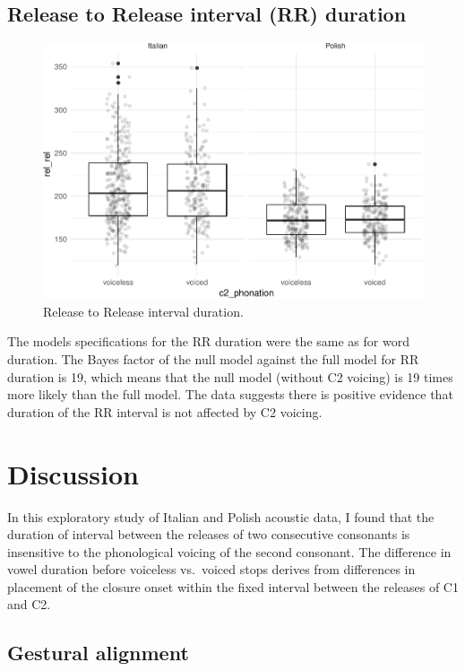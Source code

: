 \documentclass[preprint]{JASAnew}
\begin{document}
\hypertarget{release-to-release-interval-rr-duration}{%
\subsection{Release to Release interval (RR)
duration}\label{release-to-release-interval-rr-duration}}

\begin{figure}
\centering
\includegraphics{2018-jasa_files/figure-latex/rr-plot-1.pdf}
\caption{Release to Release interval duration.}
\end{figure}

The models specifications for the RR duration were the same as for word
duration. The Bayes factor of the null model against the full model for
RR duration is 19, which means that the null model (without C2 voicing)
is 19 times more likely than the full model. The data suggests there is
positive evidence that duration of the RR interval is not affected by C2
voicing.

\hypertarget{discussion}{%
\section{Discussion}\label{discussion}}

In this exploratory study of Italian and Polish acoustic data, I found
that the duration of interval between the releases of two consecutive
consonants is insensitive to the phonological voicing of the second
consonant. The difference in vowel duration before voiceless vs.~voiced
stops derives from differences in placement of the closure onset within
the fixed interval between the releases of C1 and C2.

\hypertarget{gestural-alignment}{%
\subsection{Gestural alignment}\label{gestural-alignment}}
\end{document}
